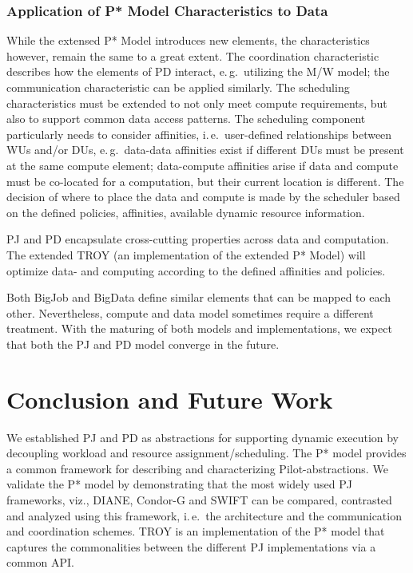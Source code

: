 \documentclass[conference,final]{IEEEtran}
\newcommand{\upp}{\vspace*{-0.5em}}
\begin{document}
\subsubsection*{Application of P* Model Characteristics to Data}

While the extensed P* Model introduces new elements, the
characteristics however, remain the same to a great extent. The
coordination characteristic describes how the elements of PD interact,
e.\,g.\ utilizing the M/W model; the communication characteristic can
be applied similarly. The scheduling characteristics must be extended
to not only meet compute requirements, but also to support common data
access patterns. The scheduling component particularly needs to
consider affinities, i.\,e.\ user-defined relationships between WUs
and/or DUs, e.\,g.\ data-data affinities exist if different DUs must
be present at the same compute element; data-compute affinities arise
if data and compute must be co-located for a computation, but their
current location is different. The decision of where to place the data
and compute is made by the scheduler based on the defined policies,
affinities, available dynamic resource information.



PJ and PD encapsulate cross-cutting properties across data and
computation. The extended TROY (an implementation of the extended P*
Model) will optimize data- and computing according to the defined
affinities and policies.

Both BigJob and BigData define similar elements that can be mapped to
each other. Nevertheless, compute and data model sometimes require a
different treatment. With the maturing of both models and
implementations, we expect that both the PJ and PD model converge in
the future.



\section{Conclusion and Future Work\upp\upp}


We established PJ and PD as abstractions for supporting dynamic
execution by decoupling workload and resource
assignment/scheduling. The P* model provides a common framework for
describing and characterizing Pilot-abstractions.  We validate the P*
model by demonstrating that the most widely used PJ frameworks,
viz., DIANE, Condor-G and SWIFT can be compared, contrasted and
analyzed using this framework, i.\,e.\ the architecture and the
communication and coordination schemes.  TROY is an implementation of
the P* model that captures the commonalities between the different PJ
implementations via a common API.
\end{document}
